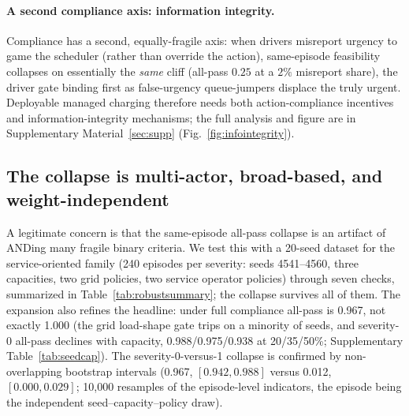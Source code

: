 \documentclass[12pt]{article}
\begin{document}
\paragraph{A second compliance axis: information integrity.} Compliance has a second, equally-fragile axis: when drivers misreport urgency to game the scheduler (rather than override the action), same-episode feasibility collapses on essentially the \emph{same} cliff (all-pass $0.25$ at a $2\%$ misreport share), the driver gate binding first as false-urgency queue-jumpers displace the truly urgent. Deployable managed charging therefore needs both action-compliance incentives and information-integrity mechanisms; the full analysis and figure are in Supplementary Material~\ref{sec:supp} (Fig.~\ref{fig:infointegrity}).

\subsection{The collapse is multi-actor, broad-based, and weight-independent}\label{sec:robust}

A legitimate concern is that the same-episode all-pass collapse is an artifact of ANDing many fragile binary criteria. We test this with a 20-seed dataset for the service-oriented family (240 episodes per severity: seeds 4541--4560, three capacities, two grid policies, two service operator policies) through seven checks, summarized in Table~\ref{tab:robustsummary}; the collapse survives all of them. The expansion also refines the headline: under full compliance all-pass is 0.967, not exactly 1.000 (the grid load-shape gate trips on a minority of seeds, and severity-0 all-pass declines with capacity, 0.988/0.975/0.938 at 20/35/50\%; Supplementary Table~\ref{tab:seedcap}). The severity-0-versus-1 collapse is confirmed by non-overlapping bootstrap intervals (0.967, $[0.942, 0.988]$ versus 0.012, $[0.000, 0.029]$; 10{,}000 resamples of the episode-level indicators, the episode being the independent seed--capacity--policy draw).
\end{document}
